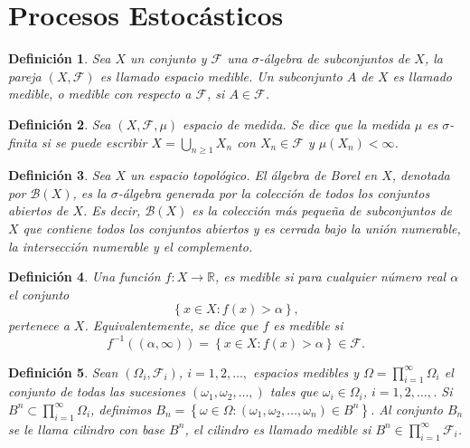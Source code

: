 \documentclass{article}
\newtheorem{Def}{Definición}[section]
\newcommand{\rea}{\mathbb{R}}
\numberwithin{equation}{section}
\begin{document}
\section{Procesos Estoc\'asticos}\label{Procesos.Estocasticos}

\begin{Def}
Sea $X$ un conjunto y $\mathcal{F}$ una $\sigma$-\'algebra de subconjuntos de $X$, la pareja $\left(X,\mathcal{F}\right)$ es llamado espacio medible. Un subconjunto $A$ de $X$ es llamado medible, o medible con respecto a $\mathcal{F}$, si $A\in\mathcal{F}$.
\end{Def}

\begin{Def}
Sea $\left(X,\mathcal{F},\mu\right)$ espacio de medida. Se dice que la medida $\mu$ es $\sigma$-finita si se puede escribir $X=\bigcup_{n\geq1}X_{n}$ con $X_{n}\in\mathcal{F}$ y $\mu\left(X_{n}\right)<\infty$.
\end{Def}

\begin{Def}\label{Cto.Borel}
Sea $X$ un espacio topológico. El álgebra de Borel en $X$, denotada por $\mathcal{B}(X)$, es la $\sigma$-álgebra generada por la colección de todos los conjuntos abiertos de $X$. Es decir, $\mathcal{B}(X)$ es la colección más pequeña de subconjuntos de $X$ que contiene todos los conjuntos abiertos y es cerrada bajo la unión numerable, la intersección numerable y el complemento.
\end{Def}

\begin{Def}\label{Funcion.Medible}
Una funci\'on $f:X\rightarrow\rea$, es medible si para cualquier n\'umero real $\alpha$ el conjunto \[\left\{x\in X:f\left(x\right)>\alpha\right\},\] pertenece a $X$. Equivalentemente, se dice que $f$ es medible si \[f^{-1}\left(\left(\alpha,\infty\right)\right)=\left\{x\in X:f\left(x\right)>\alpha\right\}\in\mathcal{F}.\]
\end{Def}


\begin{Def}\label{Def.Cilindros}
Sean $\left(\Omega_{i},\mathcal{F}_{i}\right)$, $i=1,2,\ldots,$ espacios medibles y $\Omega=\prod_{i=1}^{\infty}\Omega_{i}$ el conjunto de todas las sucesiones $\left(\omega_{1},\omega_{2},\ldots,\right)$ tales que $\omega_{i}\in\Omega_{i}$, $i=1,2,\ldots,$. Si $B^{n}\subset\prod_{i=1}^{\infty}\Omega_{i}$, definimos $B_{n}=\left\{\omega\in\Omega:\left(\omega_{1},\omega_{2},\ldots,\omega_{n}\right)\in B^{n}\right\}$. Al conjunto $B_{n}$ se le llama {\em cilindro} con base $B^{n}$, el cilindro es llamado medible si $B^{n}\in\prod_{i=1}^{\infty}\mathcal{F}_{i}$.
\end{Def}
\end{document}
